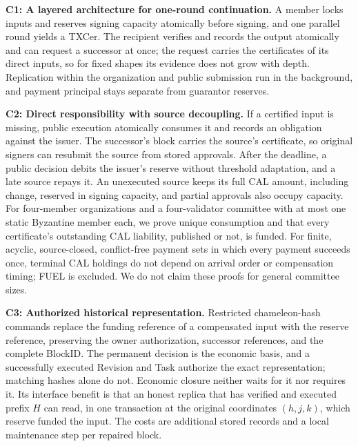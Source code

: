 \noindent\textbf{C1: A layered architecture for one-round continuation.} A member locks inputs and reserves signing capacity atomically before signing, and one parallel round yields a TXCer. The recipient verifies and records the output atomically and can request a successor at once; the request carries the certificates of its direct inputs, so for fixed shapes its evidence does not grow with depth. Replication within the organization and public submission run in the background, and payment principal stays separate from guarantor reserves.

\noindent\textbf{C2: Direct responsibility with source decoupling.} If a certified input is missing, public execution atomically consumes it and records an obligation against the issuer. The successor's block carries the source's certificate, so original signers can resubmit the source from stored approvals. After the deadline, a public decision debits the issuer's reserve without threshold adaptation, and a late source repays it. An unexecuted source keeps its full CAL amount, including change, reserved in signing capacity, and partial approvals also occupy capacity. For four-member organizations and a four-validator committee with at most one static Byzantine member each, we prove unique consumption and that every certificate's outstanding CAL liability, published or not, is funded. For finite, acyclic, source-closed, conflict-free payment sets in which every payment succeeds once, terminal CAL holdings do not depend on arrival order or compensation timing; FUEL is excluded. We do not claim these proofs for general committee sizes.

\noindent\textbf{C3: Authorized historical representation.} Restricted chameleon-hash commands replace the funding reference of a compensated input with the reserve reference, preserving the owner authorization, successor references, and the complete BlockID. The permanent decision is the economic basis, and a successfully executed Revision and Task authorize the exact representation; matching hashes alone do not. Economic closure neither waits for it nor requires it. Its interface benefit is that an honest replica that has verified and executed prefix $H$ can read, in one transaction at the original coordinates $(h,j,k)$, which reserve funded the input. The costs are additional stored records and a local maintenance step per repaired block.

